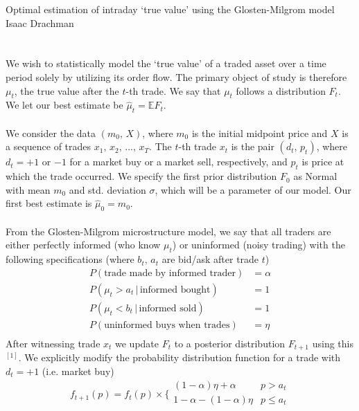 \documentclass[11pt]{report}
\begin{document}
\begingroup  
    \centering
    \Large Optimal estimation of intraday `true value' using the Glosten-Milgrom model\\
    \large Isaac Drachman\par
\endgroup
   
\section*{}
    We wish to statistically model the `true value' of a traded asset over a
    time period solely by utilizing its order flow. The primary
    object of study is therefore $\mu_t$, the true value after the $t$-th trade. We say that
    $\mu_t$ follows a distribution $F_t$. We let our best estimate
    be $\hat{\mu}_t = \mathbb{E}F_t$.\\\\    
    We consider the data $(m_0,\,X)$, where $m_0$ is the initial midpoint price and $X$ is a 
    sequence of 
    trades $x_1,\,x_2,\,...,\,x_T$. The $t$-th trade $x_t$ is the pair $(d_t,\,p_t)$, where $d_t = +1$
    or $-1$ for a market buy or a market sell, respectively, and $p_t$ is price at 
    which the trade occurred. We specify the first prior distribution $F_0$ as Normal
    with mean $m_0$ and std. deviation $\sigma$, which will be a parameter of our model. Our
    first best estimate is $\hat{\mu}_0 = m_0$.\\\\
    From the Glosten-Milgrom microstructure model, we say that all traders are either 
    perfectly informed (who know $\mu_t$) or uninformed (noisy trading) with the 
    following specifications (where $b_t,\,a_t$ are bid/ask after trade $t$)
    \begin{align*}
    P(\text{trade made by informed trader}) & = \alpha \\
    P(\mu_t > a_t\,|\,\text{informed bought}) & = 1 \\
    P(\mu_t < b_t\,|\,\text{informed sold}) & = 1 \\
    P(\text{uninformed buys when trades}) & = \eta \\
    \end{align*} 
    After witnessing trade $x_t$ we update $F_t$ to a posterior distribution $F_{t+1}$ 
    using this$\text{}^{[1]}$. We explicitly
    modify the probability distribution function for a trade with $d_t = +1$ (i.e. market buy)
    \[
    f_{t+1}(p) = f_t(p) \times
    \bigg\{\begin{array}{cc}
        (1 - \alpha)\eta + \alpha & p > a_t \\
        1 - \alpha - (1 - \alpha)\eta & p \leq a_t \\
    \end{array} 
    \]    
\end{document}
